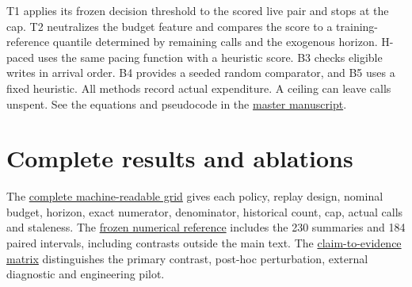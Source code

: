 \documentclass[
  11pt,
]{article}
\begin{document}
T1 applies its frozen decision threshold to the scored live pair and
stops at the cap. T2 neutralizes the budget feature and compares the
score to a training-reference quantile determined by remaining calls and
the exogenous horizon. H-paced uses the same pacing function with a
heuristic score. B3 checks eligible writes in arrival order. B4 provides
a seeded random comparator, and B5 uses a fixed heuristic. All methods
record actual expenditure. A ceiling can leave calls unspent. See the
equations and pseudocode in the \href{master.pdf}{master manuscript}.

\section{Complete results and
ablations}\label{complete-results-and-ablations}

The \href{../tables/verification-grid.csv}{complete machine-readable
grid} gives each policy, replay design, nominal budget, horizon, exact
numerator, denominator, historical count, cap, actual calls and
staleness. The
\href{../../reproducibility/data/frozen-reference.json}{frozen numerical
reference} includes the 230 summaries and 184 paired intervals,
including contrasts outside the main text. The
\href{../final_claim_index.md}{claim-to-evidence matrix} distinguishes
the primary contrast, post-hoc perturbation, external diagnostic and
engineering pilot.
\end{document}
